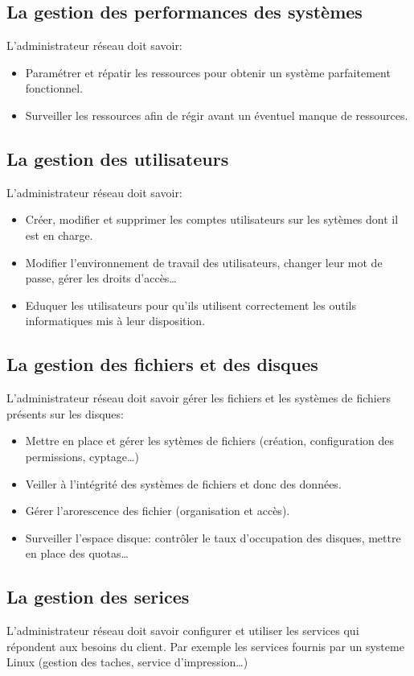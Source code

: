  \subsection{La gestion des performances des systèmes}
 L'administrateur réseau doit savoir:
 \begin{itemize}
	 \item Paramétrer et répatir les ressources pour obtenir un système parfaitement fonctionnel.
	 \item Surveiller les ressources afin de régir avant un éventuel manque de ressources.
 \end{itemize}

 \subsection{La gestion des utilisateurs}
 L'administrateur réseau doit savoir:
 \begin{itemize}
	 \item Créer, modifier et supprimer les comptes utilisateurs sur les sytèmes dont il est en charge.
	 \item Modifier l'environnement de travail des utilisateurs, changer leur mot de passe, gérer les droits d'accès\ldots
	 \item Eduquer les utilisateurs pour qu'ils utilisent correctement les outils informatiques mis à leur disposition.
 \end{itemize}

 \subsection{La gestion des fichiers et des disques}
 L'administrateur réseau doit savoir gérer les fichiers et les systèmes de fichiers présents sur les disques:
 \begin{itemize}
	 \item Mettre en place et gérer les sytèmes de fichiers (création, configuration des permissions, cyptage\ldots)
	 \item Veiller à l'intégrité des systèmes de fichiers et donc des données.
	 \item Gérer l'arorescence des fichier (organisation et accès).
	 \item Surveiller l'espace disque: contrôler le taux d'occupation des disques, mettre en place des quotas\ldots
 \end{itemize}

 \subsection{La gestion des serices}
 L'administrateur réseau doit savoir configurer et utiliser les services qui répondent aux besoins du client. Par exemple les services fournis par un systeme Linux (gestion des taches, service d'impression\ldots)

